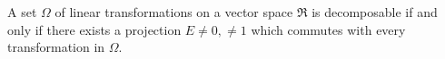 A set $\Omega$ of linear transformations on a vector space $\mathfrak{R}$ is decomposable if and only if there exists a projection $E \neq 0, \neq 1$ which commutes with every transformation in $\Omega$.
